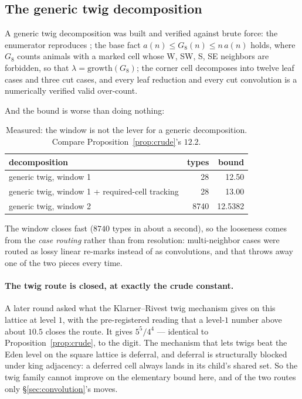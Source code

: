 \documentclass[11pt]{article}
\begin{document}
\subsection{The generic twig decomposition}

A generic twig decomposition was built and verified against brute force: the
enumerator reproduces ; the base fact
$a(n) \le G_8(n) \le n\,a(n)$ holds, where $G_8$ counts animals with a marked
cell whose W, SW, S, SE neighbors are forbidden, so that
$\lambda = \mathrm{growth}(G_8)$; the corner cell decomposes into twelve leaf
cases and three cut cases, and every leaf reduction and every cut convolution is
a numerically verified valid over-count.

And the bound is worse than doing nothing:

\begin{table}[H]
\centering
\begin{tabular}{l r r}
\toprule
decomposition & types & bound \\
\midrule
generic twig, window 1 & 28 & 12.50 \\
generic twig, window 1 + required-cell tracking & 28 & 13.00 \\
generic twig, window 2 & 8740 & 12.5382 \\
\bottomrule
\end{tabular}
\caption{Measured: the window is not the lever for a generic decomposition.
Compare Proposition~\ref{prop:crude}'s $12.2$.}
\label{tab:generic}
\end{table}

The window closes fast ($8740$ types in about a second), so the looseness comes
from the \emph{case routing} rather than from resolution: multi-neighbor cases
were routed as lossy linear re-marks instead of as convolutions, and that throws
away one of the two pieces every time.

\paragraph{The twig route is closed, at exactly the crude constant.} A later
round asked what the Klarner--Rivest twig mechanism gives on this lattice at
level $1$, with the pre-registered reading that a level-$1$ number above about
$10.5$ closes the route. It gives $5^5/4^4$ --- identical to
Proposition~\ref{prop:crude}, to the digit. The mechanism that lets twigs beat
the Eden level on the square lattice is deferral, and deferral is structurally
blocked under king adjacency: a deferred cell always lands in its child's shared
set. So the twig family cannot improve on the elementary bound here, and of the two
routes only \S\ref{sec:convolution}'s moves.
\end{document}
